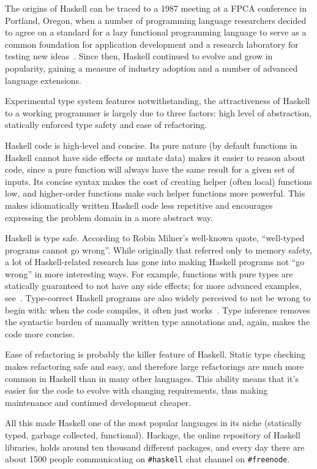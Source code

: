 \documentclass[a4paper,11pt,oneside]{report}
\begin{document}
The origins of Haskell can be traced to a 1987 meeting at a FPCA conference in
Portland, Oregon, when a number of programming language researchers decided to
agree on a standard for a lazy functional programming language to serve as a
common foundation for application development and a research laboratory for
testing new ideas~\cite{bib:hudak2007}. Since then, Haskell continued to evolve
and grow in popularity, gaining a measure of industry adoption and a number of
advanced language extensions.

Experimental type system features notwithstanding, the attractiveness of Haskell
to a working programmer is largely due to three factors: high level of
abstraction, statically enforced type safety and ease of refactoring.

Haskell code is high-level and concise. Its pure nature (by default functions in
Haskell cannot have side effects or mutate data) makes it easier to reason about
code, since a pure function will always have the same result for a given set of
inputs. Its concise syntax makes the cost of creating helper (often local)
functions low, and higher-order functions make such helper functions more
powerful. This makes idiomatically written Haskell code less repetitive and
encourages expressing the problem domain in a more abstract way.

Haskell is type safe. According to Robin Milner's well-known quote, ``well-typed
programs cannot go wrong''. While originally that referred only to memory
safety, a lot of Haskell-related research has gone into making Haskell programs
not ``go wrong'' in more interesting ways. For example, functions with pure
types are statically guaranteed to not have any side effects; for more advanced
examples, see~\cite{bib:gibbons2003}. Type-correct Haskell programs are also
widely perceived to not be wrong to begin with: when the code compiles, it often
just works~\cite{bib:wiki-works}. Type inference removes the syntactic burden of
manually written type annotations and, again, makes the code more concise.

Ease of refactoring is probably the killer feature of Haskell. Static type
checking makes refactoring safe and easy, and therefore large refactorings are
much more common in Haskell than in many other languages. This ability means
that it's easier for the code to evolve with changing requirements, thus making
maintenance and continued development cheaper.

All this made Haskell one of the most popular languages in its niche (statically
typed, garbage collected, functional). Hackage, the online repository of Haskell
libraries, holds around ten thousand different packages, and every day there are
about 1500 people communicating on \texttt{\#haskell} chat channel on
\texttt{\#freenode}.
\end{document}
